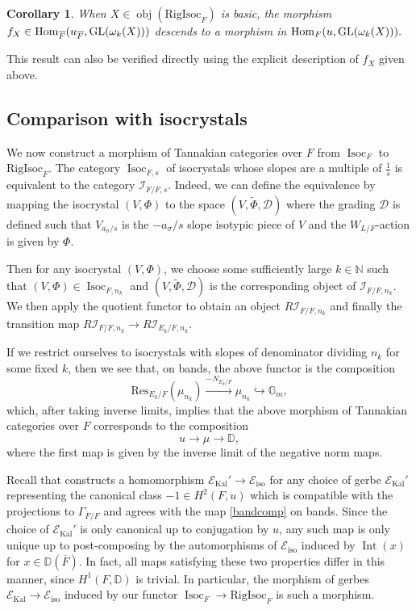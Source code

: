 \documentclass[11pt]{amsart}
\newtheorem{cor}[thm]{Corollary}
\theoremstyle{definition}
\newcommand{\mc}{\mathcal}
\newcommand{\ov}{\overline}
\newcommand{\N}{\mathbb{N}}
\newcommand{\RigIsoc}{\mathrm{RigIsoc}}
\newcommand{\GL}{\mathrm{GL}}
\DeclareMathOperator{\Kal}{Kal}
\DeclareMathOperator{\Ob}{obj}
\DeclareMathOperator{\Int}{Int}
\DeclareMathOperator{\Isoc}{Isoc}
\begin{document}
\begin{cor}
    When $X \in \Ob(\RigIsoc_{F})$ is basic, the morphism $f_{X} \in \textnormal{Hom}_{\ov{F}}(u_{\ov{F}}, \GL(\omega_{k}(X)))$ descends to a morphism in $\textnormal{Hom}_{F}(u, \GL(\omega_{k}(X))).$
\end{cor}

This result can also be verified directly using the explicit description of $f_{X}$ given above.


\subsection{Comparison with isocrystals}
We now construct a morphism of Tannakian categories over $F$ from $\Isoc_{F}$ to $\RigIsoc_{F}$. The category $\Isoc_{F,s}$ of isocrystals whose slopes are a multiple of $\frac{1}{s}$ is equivalent to the category $\mc{I}_{F/F, s}$. Indeed, we can define the equivalence by mapping the isocrystal $(V, \Phi)$ to  the space $(V, \tilde{\Phi}, \mc{D})$ where the grading $\mc{D}$ is defined such that $V_{a_{\sigma}/s}$ is the $-a_{\sigma}/s$ slope isotypic piece of $V$ and the $W_{L/F}$-action is given by $\Phi$.

Then for any isocrystal $(V, \Phi)$, we choose some sufficiently large $k \in \N$ such that $(V, \Phi) \in \Isoc_{F,n_k}$ and $(V, \tilde{\Phi}, \mc{D})$ is the corresponding object of $\mc{I}_{F/F, n_k}$. We then apply the quotient functor to obtain an object $R\mc{I}_{F/F, n_k}$ and finally the transition map $R\mc{I}_{F/F, n_k} \to R\mc{I}_{E_k/F, n_k}$.

If we restrict ourselves to isocrystals with slopes of denominator dividing $n_{k}$ for some fixed $k$, then we see that, on bands, the above functor is the composition 
\begin{equation}\label{bandcomp}
\text{Res}_{E_{k}/F}(\mu_{n_{k}}) \xrightarrow{-N_{E_{k}/F}} \mu_{n_{k}} \hookrightarrow \mathbb{G}_{m},
\end{equation}
which, after taking inverse limits, implies that the above morphism of Tannakian categories over $F$ corresponds to the composition $$u \to \mu \to \mathbb{D},$$ where the first map is given by the inverse limit of the negative norm maps. 

Recall that \cite[\S 3.3]{Kaletha18} constructs a homomorphism $\mc{E}_{\Kal}' \to \mc{E}_{\text{iso}}$ for any choice of gerbe $\mc{E}_{\Kal}'$ representing the canonical class $-1 \in H^{2}(F,u)$ which is compatible with the projections to $\Gamma_{\ov{F}/F}$ and agrees with the map \eqref{bandcomp} on bands. Since the choice of $\mc{E}_{\Kal}'$ is only canonical up to conjugation by $u$, any such map is only unique up to post-composing by the automorphisms of $\mc{E}_{\text{iso}}$ induced by $\Int(x)$ for $x \in \mathbb{D}(\ov{F})$. In fact, all maps satisfying these two properties differ in this manner, since $H^{1}(F, \mathbb{D})$ is trivial. In particular, the morphism of gerbes $\mc{E}_{\Kal} \to \mc{E}_{\text{iso}}$ induced by our functor $\Isoc_{F} \to \RigIsoc_{F}$ is such a morphism.
\end{document}
